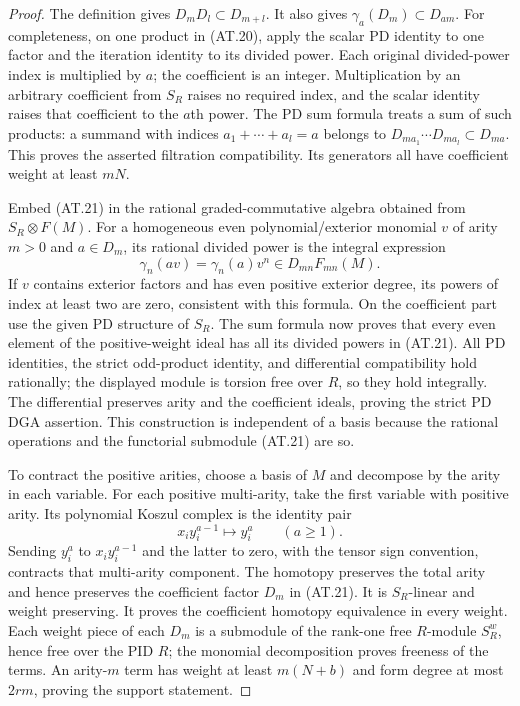 \begin{proof}
The definition gives $D_mD_l\subset D_{m+l}$.
It also gives $\gamma_a(D_m)\subset D_{am}$.
For completeness, on one product in (AT.20), apply
the scalar PD identity to one factor and the
iteration identity to its divided power. Each
original divided-power index is multiplied by $a$;
the coefficient is an integer. Multiplication by
an arbitrary coefficient from $S_R$ raises no
required index, and the scalar identity raises
that coefficient to the $a$th power. The PD sum
formula treats a sum of such products: a summand
with indices $a_1+\cdots+a_l=a$ belongs to
$D_{ma_1}\cdots D_{ma_l}\subset D_{ma}$.
This proves the asserted filtration compatibility.
Its generators all have coefficient weight at
least $mN$.

Embed (AT.21) in the rational graded-commutative
algebra obtained from $S_R\otimes F(M)$.
For a homogeneous even polynomial/exterior
monomial $v$ of arity $m>0$ and $a\in D_m$,
its rational divided power is the integral
expression
\[
 \gamma_n(av)=\gamma_n(a)v^n\in D_{mn}F_{mn}(M).
 \tag{AT.24}
\]
If $v$ contains exterior factors and has even
positive exterior degree, its powers of index
at least two are zero, consistent with this
formula. On the coefficient part use the given
PD structure of $S_R$. The sum formula now proves
that every even element of the positive-weight
ideal has all its divided powers in (AT.21).
All PD identities, the strict odd-product identity,
and differential compatibility hold rationally;
the displayed module is torsion free over $R$,
so they hold integrally. The differential preserves
arity and the coefficient ideals, proving the
strict PD DGA assertion. This construction is
independent of a basis because the rational
operations and the functorial submodule (AT.21)
are so.

To contract the positive arities, choose a basis
of $M$ and decompose by the arity in each variable.
For each positive multi-arity, take the first
variable with positive arity. Its polynomial
Koszul complex is the identity pair
\[
 x_i y_i^{a-1}\longmapsto y_i^a \qquad(a\geq1).
\]
Sending $y_i^a$ to $x_i y_i^{a-1}$ and the latter
to zero, with the tensor sign convention, contracts
that multi-arity component. The homotopy preserves
the total arity and hence preserves the coefficient
factor $D_m$ in (AT.21). It is $S_R$-linear and
weight preserving. It proves the coefficient
homotopy equivalence in every weight. Each weight
piece of each $D_m$ is a submodule of the rank-one
free $R$-module $S_R^w$, hence free over the PID
$R$; the monomial decomposition proves freeness
of the terms. An arity-$m$ term has weight at
least $m(N+b)$ and form degree at most $2rm$,
proving the support statement.


\end{proof}
